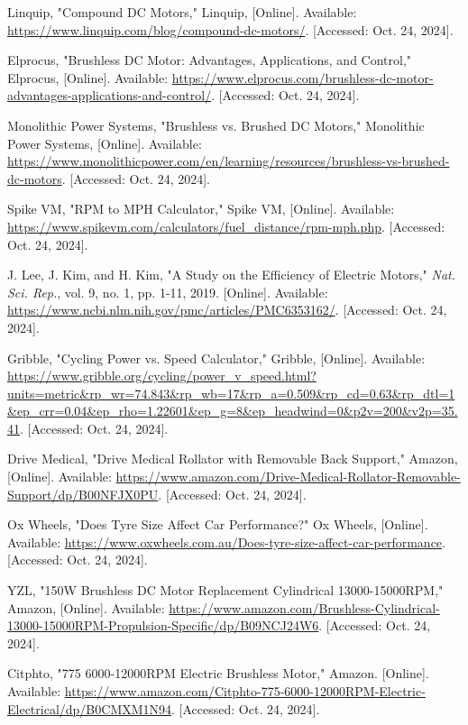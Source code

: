 \begin{thebibliography}{45}
	 Linquip, "Compound DC Motors," Linquip, [Online]. Available: \url{https://www.linquip.com/blog/compound-dc-motors/}. [Accessed: Oct. 24, 2024]. 
	
	 Elprocus, "Brushless DC Motor: Advantages, Applications, and Control," Elprocus, [Online]. Available: \url{https://www.elprocus.com/brushless-dc-motor-advantages-applications-and-control/}. [Accessed: Oct. 24, 2024]. 
	
	 Monolithic Power Systems, "Brushless vs. Brushed DC Motors," Monolithic Power Systems, [Online]. Available: \url{https://www.monolithicpower.com/en/learning/resources/brushless-vs-brushed-dc-motors}. [Accessed: Oct. 24, 2024].
	
	Spike VM, "RPM to MPH Calculator," Spike VM, [Online]. Available: \url{https://www.spikevm.com/calculators/fuel_distance/rpm-mph.php}. [Accessed: Oct. 24, 2024]. 
	
	J. Lee, J. Kim, and H. Kim, "A Study on the Efficiency of Electric Motors," \textit{Nat. Sci. Rep.}, vol. 9, no. 1, pp. 1-11, 2019. [Online]. Available: \url{https://www.ncbi.nlm.nih.gov/pmc/articles/PMC6353162/}. [Accessed: Oct. 24, 2024]. 
	
	Gribble, "Cycling Power vs. Speed Calculator," Gribble, [Online]. Available: \url{https://www.gribble.org/cycling/power_v_speed.html?units=metric&rp_wr=74.843&rp_wb=17&rp_a=0.509&rp_cd=0.63&rp_dtl=1&ep_crr=0.04&ep_rho=1.22601&ep_g=8&ep_headwind=0&p2v=200&v2p=35.41}. [Accessed: Oct. 24, 2024]. 
	
	Drive Medical, "Drive Medical Rollator with Removable Back Support," Amazon, [Online]. Available: \url{https://www.amazon.com/Drive-Medical-Rollator-Removable-Support/dp/B00NFJX0PU}. [Accessed: Oct. 24, 2024]. 
	
	Ox Wheels, "Does Tyre Size Affect Car Performance?" Ox Wheels, [Online]. Available: \url{https://www.oxwheels.com.au/Does-tyre-size-affect-car-performance}. [Accessed: Oct. 24, 2024]. 
	
	YZL, "150W Brushless DC Motor Replacement Cylindrical 13000-15000RPM," Amazon, [Online]. Available: \url{https://www.amazon.com/Brushless-Cylindrical-13000-15000RPM-Propulsion-Specific/dp/B09NCJ24W6}. [Accessed: Oct. 24, 2024]. 
	
	Citphto, "775 6000-12000RPM Electric Brushless Motor," Amazon. [Online]. Available: \url{https://www.amazon.com/Citphto-775-6000-12000RPM-Electric-Electrical/dp/B0CMXM1N94}. [Accessed: Oct. 24, 2024]. 
	

\end{thebibliography}

